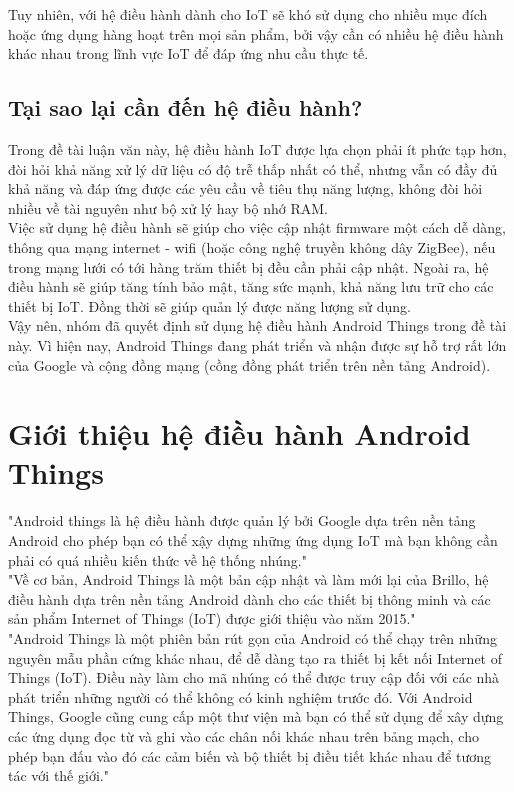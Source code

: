 Tuy nhiên, với hệ điều hành dành cho IoT sẽ khó sử dụng cho nhiều mục đích hoặc ứng dụng hàng hoạt trên mọi sản phẩm, bởi vậy cần có nhiều hệ điều hành khác nhau trong lĩnh vực IoT để đáp ứng nhu cầu thực tế.\cite{tl5}

\subsection{Tại sao lại cần đến hệ điều hành?}
Trong đề tài luận văn này, hệ điều hành IoT được lựa chọn phải ít phức tạp hơn, đòi hỏi khả năng xử lý dữ liệu có độ trễ thấp nhất có thể, nhưng vẫn có đầy đủ khả năng và đáp ứng được các yêu cầu về tiêu thụ năng lượng, không đòi hỏi nhiều về tài nguyên như bộ xử lý hay bộ nhớ RAM.\cite{tl5}\\

Việc sử dụng hệ điều hành sẽ giúp cho việc cập nhật firmware một cách dễ dàng, thông qua mạng internet - wifi (hoặc công nghệ truyền không dây ZigBee), nếu trong mạng lưới có tới hàng trăm thiết bị đều cần phải cập nhật. Ngoài ra, hệ điều hành sẽ giúp tăng tính bảo mật, tăng sức mạnh, khả năng lưu trữ cho các thiết bị IoT. Đồng thời sẽ giúp quản lý được năng lượng sử dụng.\\

Vậy nên, nhóm đã quyết định sử dụng hệ điều hành Android Things trong đề tài này. Vì hiện nay, Android Things đang phát triển và nhận được sự hỗ trợ rất lớn của Google và cộng đồng mạng (cồng đồng phát triển trên nền tảng Android).

\section{Giới thiệu hệ điều hành Android Things}
"Android things là hệ điều hành được quản lý bởi Google dựa trên nền tảng Android cho phép bạn có thể xậy dựng những ứng dụng IoT mà bạn không cần phải có quá nhiều kiến thức về hệ thống nhúng."\cite{tl6}
\\
"Về cơ bản, Android Things là một bản cập nhật và làm mới lại của Brillo, hệ điều hành dựa trên nền tảng Android dành cho các thiết bị thông minh và các sản phẩm Internet of Things (IoT) được giới thiệu vào năm 2015."\cite{tl7}
\\
"Android Things là một phiên bản rút gọn của Android có thể chạy trên những nguyên mẫu phần cứng khác nhau, để dễ dàng tạo ra thiết bị kết nối Internet of Things (IoT). Điều này làm cho mã nhúng có thể được truy cập đối với các nhà phát triển những người có thể không có kinh nghiệm trước đó. Với Android Things, Google cũng cung cấp một thư viện mà bạn có thể sử dụng để xây dựng các ứng dụng đọc từ và ghi vào các chân nối khác nhau trên bảng mạch, cho phép bạn đấu vào đó các cảm biến và bộ thiết bị điều tiết khác nhau để tương tác với thế giới."\cite{tl8}

